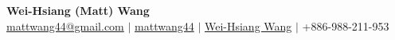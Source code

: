 \documentclass[letterpaper,11pt]{article}
\begin{document}
\begin{center}
  \textbf{\Large Wei-Hsiang (Matt) Wang} \\
  \vspace{8pt}
  \href{mailto:mattwang44@gmail.com}{\faEnvelope \hspace{1pt} mattwang44@gmail.com} {{$\vert$}}
  \href{https://github.com/mattwang44/}{\faGithub \hspace{1pt} mattwang44} {{$\vert$}}
  \href{https://www.linkedin.com/in/weihsiang-wang/}{\faLinkedin \hspace{1pt} Wei-Hsiang Wang} {{$\vert$}}
  { \faPhoneSquare \hspace{1pt} +886-988-211-953}
\end{center}

\vspace{-8pt}
\end{document}

